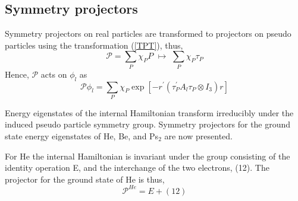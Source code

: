 \documentclass[12pt,thmsa]{article}
\begin{document}
\subsection{Symmetry projectors}

Symmetry projectors on real particles are transformed to projectors on
pseudo particles using the transformation (\ref{TPT}), thus, 
\begin{equation}
\mathcal{P}=\sum_P\chi _PP\,\,\mapsto \,\,\sum_P\chi _P\tau _P
\end{equation}
Hence, $\mathcal{P}$ acts on $\phi _l$ as 
\begin{equation}
\mathcal{P}\phi _l=\sum_P\chi _P\exp \left[ -r^{\prime }\left( \tau
_P^{\prime }A_l\tau _P\otimes I_3\right) r\right]
\end{equation}

Energy eigenstates of the internal Hamiltonian transform irreducibly under
the induced pseudo particle symmetry group. Symmetry projectors for the
ground state energy eigenstates of He, Be, and Ps$_2$ are now presented.

For He the internal Hamiltonian is invariant under the group consisting of
the identity operation E, and the interchange of the two electrons, (12).
The projector for the ground state of He is thus, 
\begin{equation}
\mathcal{P}^{He}=E+\left( 12\right)  \label{Heproj}
\end{equation}
\end{document}
